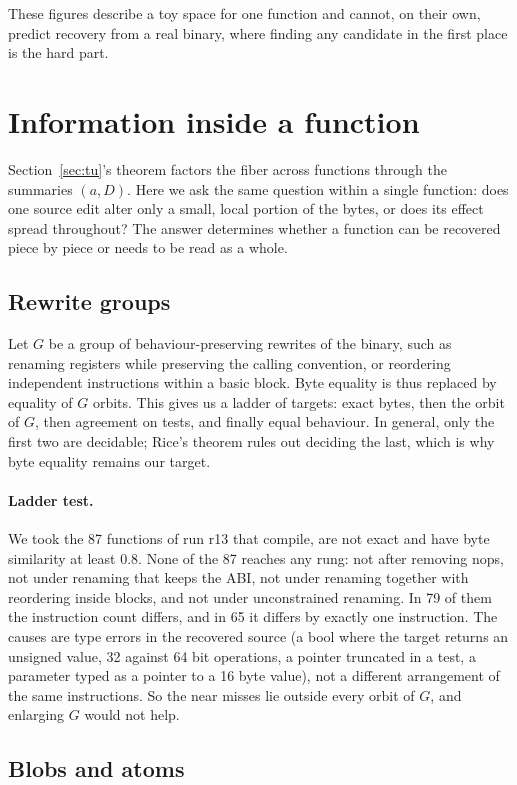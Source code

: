 \documentclass[11pt]{article}
\theoremstyle{definition}
\theoremstyle{remark}
\begin{document}
These figures describe a toy space for one function and cannot, on their own, predict recovery from a real binary, where finding any candidate in the first place is the hard part.
\section{Information inside a function}

Section~\ref{sec:tu}'s theorem factors the fiber across functions through the summaries $(a, D)$. Here we ask the same question within a single function: does one source edit alter only a small, local portion of the bytes, or does its effect spread throughout? The answer determines whether a function can be recovered piece by piece or needs to be read as a whole.

\subsection{Rewrite groups}

Let $G$ be a group of behaviour-preserving rewrites of the binary, such as renaming registers while preserving the calling convention, or reordering independent instructions within a basic block. Byte equality is thus replaced by equality of $G$ orbits. This gives us a ladder of targets: exact bytes, then the orbit of $G$, then agreement on tests, and finally equal behaviour. In general, only the first two are decidable; Rice's theorem rules out deciding the last, which is why byte equality remains our target.

\paragraph{Ladder test.} We took the 87 functions of run r13 that compile, are not exact and have byte similarity at least $0.8$. None of the 87 reaches any rung: not after removing nops, not under renaming that keeps the ABI, not under renaming together with reordering inside blocks, and not under unconstrained renaming. In 79 of them the instruction count differs, and in 65 it differs by exactly one instruction. The causes are type errors in the recovered source (a bool where the target returns an unsigned value, 32 against 64 bit operations, a pointer truncated in a test, a parameter typed as a pointer to a 16 byte value), not a different arrangement of the same instructions. So the near misses lie outside every orbit of $G$, and enlarging $G$ would not help.

\subsection{Blobs and atoms}
\end{document}
